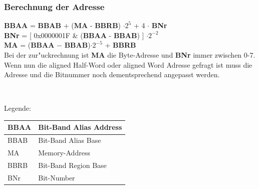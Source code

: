 \subsubsection{Berechnung der Adresse}
\begin{minipage}{12cm}
	\vspace{-2ex}
	\textbf{BBAA} = \textbf{BBAB} + (\textbf{MA} - \textbf{BBRB}) $\cdot 2^5$ + 4 $\cdot$ \textbf{BNr}\\
	\textbf{BNr} = [ 0x0000001F \& (\textbf{BBAA} - \textbf{BBAB}) ] $\cdot 2^{-2}$\\
	\textbf{MA} = (\textbf{BBAA} $-$ \textbf{BBAB})$\cdot 2^{-5}$ + \textbf{BBRB}\\
	
	Bei der zur"uckrechnung ist \textbf{MA} die Byte-Adresse und \textbf{BNr} immer zwischen 0-7. Wenn nun die aligned Half-Word oder aligned Word Adresse gefragt ist muss die Adresse und die Bitnummer noch dementsprechend angepasst werden.
\end{minipage}
%
\begin{minipage}{0.5cm}
	\-\
\end{minipage}
%
\begin{minipage}{6cm}
	Legende:
	\begin{tabular}{|l|l|}
		\hline
		BBAA & Bit-Band Alias Address\\\hline
		BBAB & Bit-Band Alias Base \\\hline
		MA & Memory-Address \\\hline
		BBRB & Bit-Band Region Base\\\hline
		BNr & Bit-Number\\\hline
	\end{tabular}
\end{minipage}